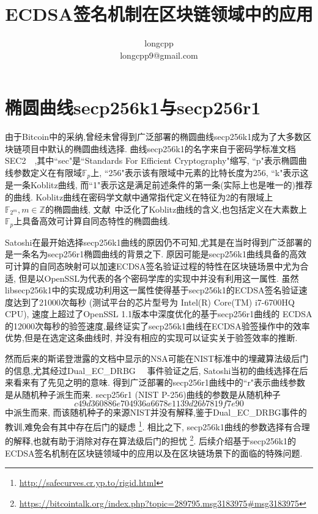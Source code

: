 \documentclass{article}
\newcommand{\Z}{\mathbb{Z}}
\newcommand{\F}{\mathbb{F}}
\begin{document}
\title{ECDSA签名机制在区块链领域中的应用}
\author{longcpp \\ longcpp9@gmail.com}

\maketitle

\section{椭圆曲线secp256k1与secp256r1}

由于Bitcoin中的采纳,曾经未曾得到广泛部署的椭圆曲线secp256k1成为了大多数区块链项目中默认的椭圆曲线选择.
曲线secp256k1的名字来自于密码学标准文档SEC2~\cite{}~,其中``sec"是``Standards For Efficient Cryptography"缩写,
``p"表示椭圆曲线参数定义在有限域$\F_p$上, ``256"表示该有限域中元素的比特长度为256, 
``k"表示这是一条Koblitz曲线, 而``1"表示这是满足前述条件的第一条(实际上也是唯一的)推荐的曲线.
Koblitz曲线在密码学文献中通常指代定义在特征为2的有限域上$\F_{2^m}, m\in\Z$的椭圆曲线,
文献~\cite{}中泛化了Koblitz曲线的含义,也包括定义在大素数上$\F_p$上具备高效可计算自同态特性的椭圆曲线.

Satoshi在最开始选择secp256k1曲线的原因仍不可知,尤其是在当时得到广泛部署的是一条名为secp256r1椭圆曲线的背景之下.
原因可能是secp256k1曲线具备的高效可计算的自同态映射可以加速ECDSA签名验证过程的特性在区块链场景中尤为合适,
但是以OpenSSL为代表的各个密码学库的实现中并没有利用这一属性.
虽然libsecp256k1中的实现成功利用这一属性使得基于secp256k1的ECDSA签名验证速度达到了21000次每秒
(测试平台的芯片型号为 Intel(R) Core(TM) i7-6700HQ CPU), 速度上超过了OpenSSL 1.1版本中深度优化的基于secp256r1曲线的
ECDSA的12000次每秒的验签速度,最终证实了secp256k1曲线在ECDSA验签操作中的效率优势,但是在选定这条曲线时,
并没有相应的实现可以证实关于验签效率的推断.

然而后来的斯诺登泄露的文档中显示的NSA可能在NIST标准中的埋藏算法级后门的信息,尤其经过Dual_EC_DRBG~\cite{}~
事件验证之后, Satoshi当初的曲线选择在后来看来有了先见之明的意味. 
得到广泛部署的secp256r1曲线中的``r"表示曲线参数是从随机种子派生而来. 
secp256r1 (NIST P-256)曲线的参数是从随机种子
$$c49d3608 86e70493 6a6678e1 139d26b7 819f7e90$$
中派生而来, 而该随机种子的来源NIST并没有解释,鉴于Dual_EC_DRBG事件的教训,难免会有其中存在后门的疑虑
\footnote{\url{http://safecurves.cr.yp.to/rigid.html}}.
相比之下, secp256k1曲线的参数选择有合理的解释,也就有助于消除对存在算法级后门的担忧
\footnote{\url{https://bitcointalk.org/index.php?topic=289795.msg3183975\#msg3183975}}.
后续介绍基于secp256k1的ECDSA签名机制在区块链领域中的应用以及在区块链场景下的面临的特殊问题.
\end{document}
